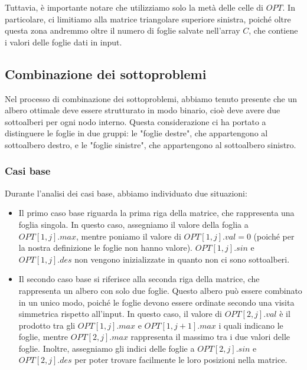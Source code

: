 Tuttavia, è importante notare che utilizziamo solo la metà delle celle di $OPT$. In particolare,
ci limitiamo alla matrice triangolare superiore sinistra, poiché oltre questa 
zona andremmo oltre il numero di foglie salvate nell'array $C$, che contiene i valori delle foglie dati in input.

\subsection{Combinazione dei sottoproblemi}

Nel processo di combinazione dei sottoproblemi, abbiamo tenuto presente che un albero ottimale deve essere strutturato in modo binario, cioè deve avere due 
sottoalberi per ogni nodo interno. Questa considerazione ci ha portato a distinguere le foglie in due gruppi: le "foglie destre", che appartengono al sottoalbero 
destro, e le "foglie sinistre", che appartengono al sottoalbero sinistro.

\subsubsection*{Casi base}

Durante l'analisi dei casi base, abbiamo individuato due situazioni:

\begin{itemize}
	\item {
		Il primo caso base riguarda la prima riga della matrice, che rappresenta una foglia singola. In questo caso, assegniamo il valore della foglia a $OPT[1, j].max$, 
		mentre poniamo il valore di $OPT[1, j].val = 0$ (poiché per la nostra definizione le foglie non hanno valore). $OPT[1, j].sin$ e $OPT[1, j].des$ non vengono inizializzate in quanto 
		non ci sono sottoalberi.
	}
	\item {
		Il secondo caso base si riferisce alla seconda riga della matrice, che rappresenta un albero con solo due foglie. Questo albero può essere combinato in un 
		unico modo, poiché le foglie devono essere ordinate secondo una visita simmetrica rispetto all'input. In questo caso, il valore di $OPT[2, j].val$ è il prodotto tra 
		gli $OPT[1, j].max$ e $OPT[1, j + 1].max$ i quali indicano le foglie, mentre $OPT[2, j].max$ rappresenta il massimo tra i due valori delle foglie. Inoltre, assegniamo gli indici delle foglie a $OPT[2, j].sin$ e $OPT[2, j].des$ 
		per poter trovare facilmente le loro posizioni nella matrice.
	}
\end{itemize}

